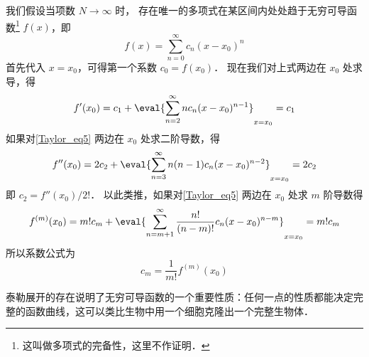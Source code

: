 我们假设当项数 $N \to \infty$ 时， 存在唯一的多项式在某区间内处处趋于无穷可导函数\footnote{这叫做多项式的完备性，这里不作证明．} $f(x)$，即
\begin{equation}\label{Taylor_eq5}
f(x) = \sum_{n = 0}^\infty  c_n (x - x_0)^n
\end{equation}
首先代入 $x = x_0$，可得第一个系数 $c_0 = f(x_0)$． 现在我们对上式两边在 $x_0$ 处求导，得
\begin{equation}
f'(x_0) = c_1 + \eval{ \sum_{n = 2}^\infty n c_n (x - x_0)^{n - 1} }_{x = x_0}  = c_1
\end{equation}
如果对\autoref{Taylor_eq5} 两边在 $x_0$ 处求二阶导数，得
\begin{equation}
f''(x_0) = 2 c_2 + \eval{ \sum_{n = 3}^\infty  n(n - 1) c_n (x - x_0)^{n - 2} }_{x = x_0}  = 2 c_2
\end{equation}
即 $c_2 = f''(x_0)/2!$．  以此类推，如果对\autoref{Taylor_eq5} 两边在 $x_0$ 处求 $m$ 阶导数得
\begin{equation}
f^{(m)}(x_0) = m! c_m + \eval{ \sum_{n = m + 1}^\infty  \frac{n!}{(n - m)!} c_n (x - x_0)^{n - m} }_{x = x_0}  = m! c_m
\end{equation}
所以系数公式为
\begin{equation}
{c_m} = \frac{1}{m!} f^{(m)}(x_0)
\end{equation}

泰勒展开的存在说明了无穷可导函数的一个重要性质：任何一点的性质都能决定完整的函数曲线，这可以类比生物中用一个细胞克隆出一个完整生物体．

